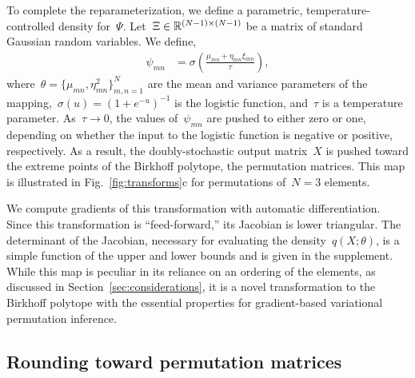 \documentclass[twoside]{article}
\begin{document}
To complete the reparameterization, we define a parametric,
temperature-controlled density for~$\Psi$.
Let~${\Xi \in \mathbb{R}^{(N-1) \times (N-1)}}$ be a matrix of standard
Gaussian random variables.  We
define,
\begin{align*}
  \psi_{mn} &= \sigma\left( \frac{\mu_{mn} + \eta_{mn} \xi_{mn}}{\tau} \right),
\end{align*}
where~${\theta = \{\mu_{mn}, \eta^2_{mn}\}_{m,n=1}^N}$ are the mean
and variance parameters of the
mapping,~${\sigma(u) = (1+e^{-u})^{-1}}$ is the logistic function,
and~$\tau$ is a temperature parameter. As~$\tau \to 0$, the values
of~$\psi_{mn}$ are pushed to either zero or one, depending on whether
the input to the logistic function is negative or positive,
respectively.  As a result, the doubly-stochastic output matrix~$X$ is
pushed toward the extreme points of the Birkhoff polytope, the
permutation matrices.  This map is illustrated in
Fig.~\ref{fig:transforms}c for permutations of~${N=3}$
elements.

We compute gradients of this transformation with automatic
differentiation.  Since this transformation is ``feed-forward,'' its
Jacobian is lower triangular. The determinant of the Jacobian, necessary for evaluating the density~$q(X; \theta)$, is a simple function of the upper and lower bounds and is given in the supplement.
While this map is peculiar in its reliance on an ordering of the
elements, as discussed in Section~\ref{sec:considerations}, it is a
novel transformation to the Birkhoff polytope with the essential
properties for gradient-based variational permutation inference.

\subsection{Rounding toward permutation matrices}
\label{sub:rounding}
\end{document}
